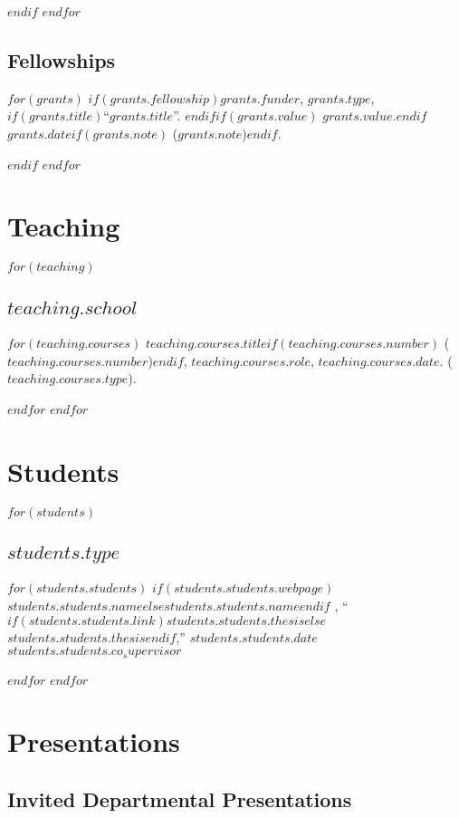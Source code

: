 \documentclass[11pt]{article}
\begin{document}
$endif$
$endfor$

\subsection{Fellowships}
$for(grants)$
$if(grants.fellowship)$\ind \textit{$grants.funder$}, $grants.type$, $if(grants.title)$``$grants.title$''. $endif$$if(grants.value)$ $grants.value$.$endif$ $grants.date$$if(grants.note)$ ($grants.note$)$endif$.

$endif$
$endfor$

\section{Teaching}

$for(teaching)$
\subsection{$teaching.school$}
$for(teaching.courses)$
\ind $teaching.courses.title$$if(teaching.courses.number)$ ($teaching.courses.number$)$endif$, $teaching.courses.role$, $teaching.courses.date$. ($teaching.courses.type$).

$endfor$
$endfor$

\section{Students}

$for(students)$
\subsection{$students.type$}
$for(students.students)$
\ind $if(students.students.webpage)$\href{$students.students.webpage$}{$students.students.name$}$else$$students.students.name$$endif$ , ``$if(students.students.link)$\href{$students.students.link$}{$students.students.thesis$}$else$$students.students.thesis$$endif$,'' $students.students.date$ $students.students.co_supervisor$ 




$endfor$
$endfor$

\section{Presentations}

\subsection{Invited Departmental Presentations}
\end{document}
